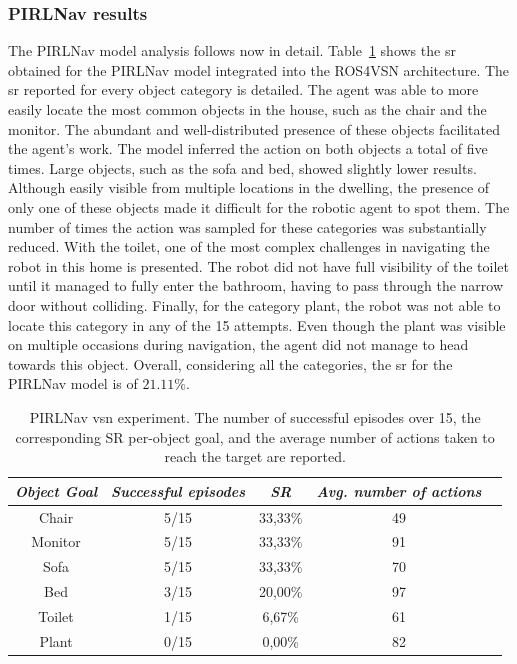 \subsubsection{PIRLNav results}
\label{subsubsec:pirlnav_results}

The PIRLNav model analysis follows now in detail.
Table~\ref{tab:pirlnav} shows the \acrshort{sr} obtained for the PIRLNav model integrated into the ROS4VSN architecture.
The \acrshort{sr} reported for every object category is detailed.
The agent was able to more easily locate the most common objects in the house, such as the chair and the monitor.
The abundant and well-distributed presence of these objects facilitated the agent's work.
The model inferred the action \stopac on both objects a total of five times.
Large objects, such as the sofa and bed, showed slightly lower results.
Although easily visible from multiple locations in the dwelling, the presence of only one of these objects made it difficult for the robotic agent to spot them.
The number of times the \stopac action was sampled for these categories was substantially reduced.
With the toilet, one of the most complex challenges in navigating the robot in this home is presented.
The robot did not have full visibility of the toilet until it managed to fully enter the bathroom, having to pass through the narrow door without colliding.
Finally, for the category plant, the robot was not able to locate this category in any of the 15 attempts.
Even though the plant was visible on multiple occasions during navigation, the agent did not manage to head towards this object.
Overall, considering all the categories, the \acrshort{sr} for the PIRLNav model is of $21.11\%$.

\begin{table}[t]
\centering
\begin{tabular}{c|cccc}
\toprule
\textit{\textbf{Object Goal}} & \textit{\textbf{Successful episodes}} & \textit{\textbf{SR}} &  \textit{\textbf{Avg. number of actions}}   \\ \midrule
Chair                & 5/15     & 33,33\%   &   49  \\
Monitor              & 5/15     & 33,33\%   &   91  \\
Sofa                 & 5/15     & 33,33\%   &   70  \\
Bed                  & 3/15     & 20,00\%   &   97  \\
Toilet               & 1/15     & 6,67\%    &   61  \\
Plant                & 0/15     & 0,00\%    &   82  \\ \bottomrule
\end{tabular}
\caption{PIRLNav \acrshort{vsn} experiment. The number of successful episodes over 15, the corresponding SR per-object goal, and the average number of actions taken to reach the target are reported.}
\label{tab:pirlnav}
\end{table}

